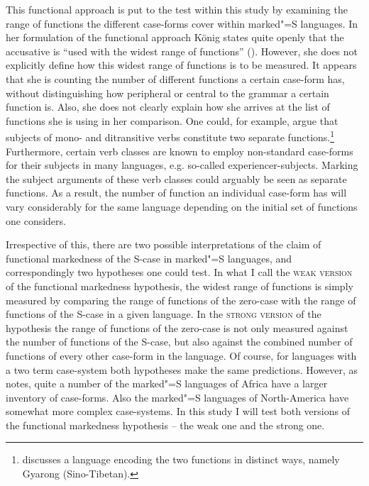 This functional approach is put to the test within this study by examining the range of functions the different case-forms cover within marked"=S languages. 
In her formulation of the functional approach K\"onig states quite openly that the accusative is ``used with the widest range of functions'' (\citeyear[138]{Koenig:2008}). 
However, she does not explicitly define how this widest range of functions is to be measured. 
It appears that she is counting the number of different functions a certain case-form has, without distinguishing how peripheral or central to the grammar a certain function is. 
Also, she does not clearly explain how she arrives at the list of functions she is using in her comparison.  
One could, for example, argue that subjects of mono- and ditransitive verbs constitute two separate functions.\footnote{\citet[403]{Bickel.align} discusses a language encoding the two functions in distinct ways, namely Gyarong (Sino-Tibetan).}
Furthermore, certain verb classes are known to employ non-standard case-forms for their subjects in many languages, e.g. so-called experiencer-subjects. 
Marking the subject arguments of these verb classes could arguably be seen as separate functions.
As a result, the number of function an individual case-form has will vary considerably for the same language depending on the initial set of functions one considers.

Irrespective of this, there are two possible interpretations of the claim of functional markedness of the S-case in marked"=S languages, and correspondingly two hypotheses one could test. 
In what I call the \textsc{weak version} of the functional markedness hypothesis, the widest range of functions is simply measured by comparing the range of functions of the zero-case with the range of functions of the S-case in a given language. 
In the \textsc{strong version} of the hypothesis the range of functions of the zero-case is not only measured against the number of functions of the S-case, but also against the combined number of functions of every other case-form in the language. 
Of course, for languages with a two term case-system both hypotheses make the same predictions. 
However, as \citet{Koenig:2008} notes, quite a number of the marked"=S languages of Africa have a larger inventory of case-forms. 
Also the marked"=S languages of North-America have somewhat more complex case-systems.
In this study I will test both versions of the functional markedness hypothesis -- the weak one and
the strong one.%

